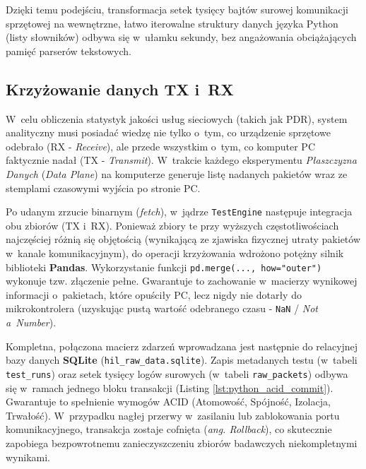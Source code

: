 Dzięki temu podejściu, transformacja setek tysięcy bajtów surowej komunikacji sprzętowej na wewnętrzne, łatwo iterowalne struktury danych języka Python (listy słowników) odbywa się w~ułamku sekundy, bez angażowania obciążających pamięć parserów tekstowych.

\subsection{Krzyżowanie danych TX i~RX}

W~celu obliczenia statystyk jakości usług sieciowych (takich jak PDR), system analityczny musi posiadać wiedzę nie tylko o~tym, co urządzenie sprzętowe odebrało (RX - \textit{Receive}), ale przede wszystkim o~tym, co komputer PC faktycznie nadał (TX - \textit{Transmit}).
W~trakcie każdego eksperymentu \textit{Płaszczyzna Danych} (\textit{Data Plane}) na komputerze generuje listę nadanych pakietów wraz ze stemplami czasowymi wyjścia po stronie PC.

Po udanym zrzucie binarnym (\textit{fetch}), w~jądrze \texttt{TestEngine} następuje integracja obu zbiorów (TX i~RX).
Ponieważ zbiory te przy wyższych częstotliwościach najczęściej różnią się objętością (wynikającą ze zjawiska fizycznej utraty pakietów w~kanale komunikacyjnym), do operacji krzyżowania wdrożono potężny silnik biblioteki \textbf{Pandas}.
Wykorzystanie funkcji \texttt{pd.merge(..., how="outer")} wykonuje tzw. złączenie pełne.
Gwarantuje to zachowanie w~macierzy wynikowej informacji o~pakietach, które opuściły PC, lecz nigdy nie dotarły do mikrokontrolera (uzyskując pustą wartość odebranego czasu - \texttt{NaN} / \textit{Not a~Number}).

Kompletna, połączona macierz zdarzeń wprowadzana jest następnie do relacyjnej bazy danych \textbf{SQLite} (\texttt{hil\_raw\_data.sqlite}).
Zapis metadanych testu (w~tabeli \texttt{test\_runs}) oraz setek tysięcy logów surowych (w~tabeli \texttt{raw\_packets}) odbywa się w~ramach jednego bloku transakcji (Listing \ref{lst:python_acid_commit}).
Gwarantuje to spełnienie wymogów ACID (Atomowość, Spójność, Izolacja, Trwałość).
W~przypadku nagłej przerwy w~zasilaniu lub zablokowania portu komunikacyjnego, transakcja zostaje cofnięta (\textit{ang. Rollback}), co skutecznie zapobiega bezpowrotnemu zanieczyszczeniu zbiorów badawczych niekompletnymi wynikami.

